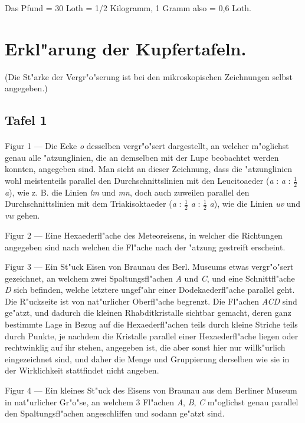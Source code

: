 \documentclass[a4paper, 11pt, oneside]{article}
\begin{document}
\begin{center}
Das Pfund = 30 Loth = 1/2 Kilogramm, 1 Gramm also = 0,6 Loth.
\end{center}
\clearpage
\section{Erkl"arung der Kupfertafeln.}
\begin{center}
(Die St"arke der Vergr"o"serung ist bei den mikroskopischen Zeichnungen selbst angegeben.)
\end{center}
\subsection{Tafel 1}
\paragraph{}
Figur 1 --- Die Ecke \emph{o} desselben vergr"o"sert dargestellt, an welcher m"oglichst genau alle "atzunglinien, die an demselben mit der Lupe beobachtet werden konnten, angegeben sind. Man sieht an dieser Zeichnung, dass die "atzunglinien wohl meistenteils parallel den Durchschnittslinien mit den Leucitoaeder (\emph{a} : \emph{a} : $\frac{1}{2}$ \emph{a}), wie z. B. die Linien \emph{lm} und \emph{mn}, doch auch zuweilen parallel den Durchschnittslinien mit dem Triakisoktaeder (\emph{a} : $\frac{1}{2}$ \emph{a} : $\frac{1}{2}$ \emph{a}), wie die Linien \emph{uv} und \emph{vw} gehen.

Figur 2 --- Eine Hexaederfl"ache des Meteoreisens, in welcher die Richtungen angegeben sind nach welchen die Fl"ache nach der "atzung gestreift erscheint.

Figur 3 --- Ein St"uck Eisen von Braunau des Berl. Museums etwas vergr"o"sert gezeichnet, an welchem zwei Spaltungsfl"achen \emph{A} und \emph{C}, und eine Schnittfl"ache \emph{D} sich befinden, welche letztere ungef"ahr einer Dodekaederfl"ache parallel geht. Die R"uckseite ist von nat"urlicher Oberfl"ache begrenzt. Die Fl"achen \emph{ACD} sind ge"atzt, und dadurch die kleinen Rhabditkristalle sichtbar gemacht, deren ganz bestimmte Lage in Bezug auf die Hexaederfl"achen teils durch kleine Striche teils durch Punkte, je nachdem die Kristalle parallel einer Hexaederfl"ache liegen oder rechtwinklig auf ihr stehen, angegeben ist, die aber sonst hier nur willk"urlich eingezeichnet sind, und daher die Menge und Gruppierung derselben wie sie in der Wirklichkeit stattfindet nicht angeben.

Figur 4 --- Ein kleines St"uck des Eisens von Braunau aus dem Berliner Museum in nat"urlicher Gr"o"se, an welchem 3 Fl"achen \emph{A}, \emph{B}, \emph{C} m"oglichst genau parallel den Spaltungsfl"achen angeschliffen und sodann ge"atzt sind.
\end{document}
